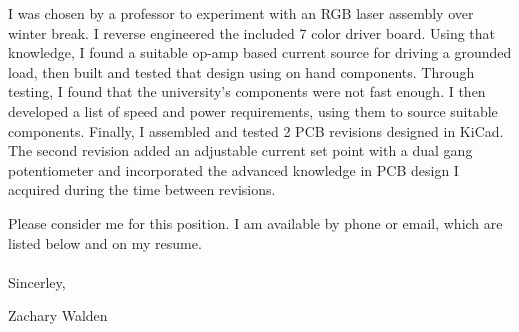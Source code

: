 \documentclass{article}
\begin{document}
\begin{adjustwidth}{70pt}{70pt}
\begin{spacing}{1.25}
I was chosen by a professor to experiment with an RGB laser assembly over winter break. I reverse engineered the included 7 color driver board. Using that knowledge, I found a suitable op-amp based current source for driving a grounded load, then built and tested that design using on hand components. Through testing, I found that the university's components were not fast enough. I then developed a list of speed and power requirements, using them to source suitable components. Finally, I assembled and tested 2 PCB revisions designed in KiCad. The second revision added an adjustable current set point with a dual gang potentiometer and incorporated the advanced knowledge in PCB design I acquired during the time between revisions.

Please consider me for this position.
I am available by phone or email, which are listed below and on my resume.\\ \\
Sincerley,

Zachary Walden

\vspace*{\fill}
\end{spacing}
\end{adjustwidth}

\newpage
\end{document}
